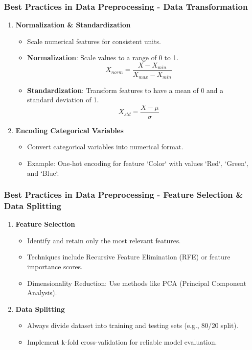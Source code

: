 \documentclass[aspectratio=169]{beamer}
\begin{document}
\begin{frame}[fragile]
    \frametitle{Best Practices in Data Preprocessing - Data Transformation}
    \begin{enumerate}
        \item \textbf{Normalization \& Standardization}
            \begin{itemize}
                \item Scale numerical features for consistent units.
                \item \textbf{Normalization}: Scale values to a range of 0 to 1.
                \begin{equation}
                    X_{norm} = \frac{X - X_{min}}{X_{max} - X_{min}}
                \end{equation}
                \item \textbf{Standardization}: Transform features to have a mean of 0 and a standard deviation of 1.
                \begin{equation}
                    X_{std} = \frac{X - \mu}{\sigma}
                \end{equation}
            \end{itemize}
        \item \textbf{Encoding Categorical Variables}
            \begin{itemize}
                \item Convert categorical variables into numerical format.
                \item Example: One-hot encoding for feature `Color` with values `Red`, `Green`, and `Blue`.
            \end{itemize}
    \end{enumerate}
\end{frame}

\begin{frame}[fragile]
    \frametitle{Best Practices in Data Preprocessing - Feature Selection \& Data Splitting}
    \begin{enumerate}
        \item \textbf{Feature Selection}
            \begin{itemize}
                \item Identify and retain only the most relevant features.
                \item Techniques include Recursive Feature Elimination (RFE) or feature importance scores.
                \item Dimensionality Reduction: Use methods like PCA (Principal Component Analysis).
            \end{itemize}
        \item \textbf{Data Splitting}
            \begin{itemize}
                \item Always divide dataset into training and testing sets (e.g., 80/20 split).
                \item Implement k-fold cross-validation for reliable model evaluation.
            \end{itemize}
    \end{enumerate}
\end{frame}
\end{document}
